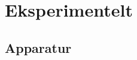 \documentclass[../Elmag-labhefte-2020.tex]{subfiles}
\begin{document}

\section{Eksperimentelt \label{ch.magnetfelt.eksperimentelt}}

\subsection{Apparatur}
\end{document}
